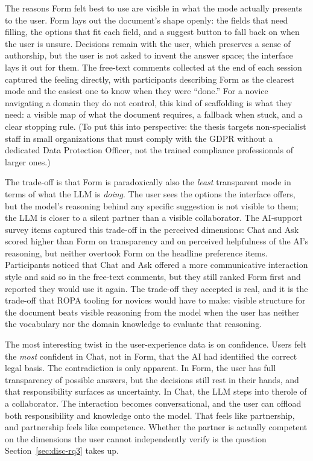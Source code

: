 The reasons Form felt best to use are visible in what the mode
actually presents to the user. Form lays out the document's
shape openly: the fields that need filling, the options that fit
each field, and a suggest button to fall back on when the user
is unsure. Decisions remain with the user, which preserves a
sense of authorship, but the user is not asked to invent the
answer space; the interface lays it out for them. The free-text
comments collected at the end of each session captured the
feeling directly, with participants describing Form as the
clearest mode and the easiest one to know when they were
``done.'' For a novice navigating a domain they do not control,
this kind of scaffolding is what they need: a visible map of
what the document requires, a fallback when stuck, and a clear
stopping rule. (To put this into perspective: the thesis targets non-specialist staff in
small organizations that must comply with the GDPR without a
dedicated Data Protection Officer, not the trained compliance
professionals of larger ones.)

The trade-off is that Form is paradoxically also the
\emph{least} transparent mode in terms of what the LLM is
\emph{doing}. The user sees the options the interface offers,
but the model's reasoning behind any specific suggestion is not
visible to them; the LLM is closer to a silent partner than a
visible collaborator. The AI-support survey items captured this
trade-off in the perceived dimensions: Chat and Ask scored higher
than Form on transparency and on perceived helpfulness of the
AI's reasoning, but neither overtook Form on the headline
preference items. Participants noticed that Chat and Ask offered
a more communicative interaction style and said so in the
free-text comments, but they still ranked Form first and reported
they would use it again. The trade-off they accepted is real,
and it is the trade-off that ROPA tooling for novices would
have to make: visible structure for the document beats visible
reasoning from the model when the user has neither the
vocabulary nor the domain knowledge to evaluate that reasoning.

The most interesting twist in the user-experience data is on
confidence. Users felt the \emph{most} confident in Chat, not in
Form, that the AI had identified the correct legal basis. The
contradiction is only apparent. In Form, the user has full
transparency of possible answers, but the decisions still rest
in their hands, and that responsibility surfaces as uncertainty.
In Chat, the LLM steps into therole of a collaborator.
The interaction becomes conversational,
and the user can offload both responsibility and knowledge onto
the model. That feels like partnership, and partnership feels
like competence. Whether the partner is actually competent on
the dimensions the user cannot independently verify is the
question Section~\ref{sec:disc-rq3} takes up.

